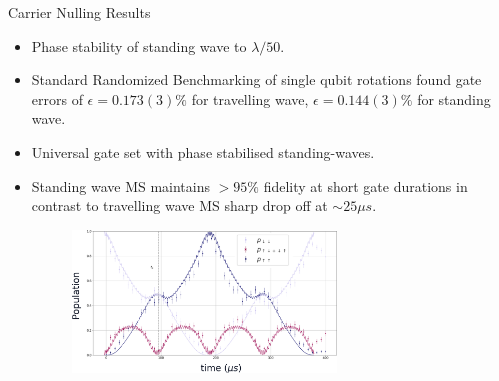 \documentclass[final]{beamer}
\begin{document}
\begin{frame}{}
\begin{center}
\begin{columns}[t]
\begin{column}{0.49\textwidth}
  \end{column}
  \begin{column}{0.49\textwidth}
    \begin{alertblock}{Carrier Nulling Results}
      \begin{minipage}{0.6\linewidth}
      \begin{itemize}
        \item Phase stability of standing wave to $\lambda/50$.
        \item Standard Randomized Benchmarking of single qubit
          rotations found gate errors of $\epsilon = 0.173(3)\%$ for
          travelling wave, $\epsilon = 0.144(3)\%$ for standing
          wave.
        \item Universal gate set with phase stabilised standing-waves.
        \item Standing wave MS maintains $>95\%$ fidelity at short gate durations in contrast to travelling wave MS sharp drop off at $\sim 25\mu s$.\\
      \begin{figure}
        \includegraphics[width=0.7\textwidth]{./figs/temp_gate_profile.png}
      \end{figure}
      \end{itemize}
      \end{minipage}
      ~~~~
      \begin{minipage}{0.34\linewidth}
      \begin{figure}
        \fbox{
}
\end{figure}
\end{minipage}
\end{alertblock}
\end{column}
\end{columns}
\end{center}
\end{frame}
\end{document}
